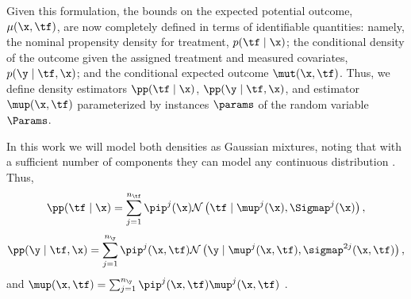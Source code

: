 Given this formulation, the bounds on the expected potential outcome, $\mu(\x, \tf)$, are now completely defined in terms of identifiable quantities: namely, the nominal propensity density for treatment, $p(\tf \mid \x)$; the conditional density of the outcome given the assigned treatment and measured covariates, $p(\y \mid \tf, \x)$; and the conditional expected outcome $\mut(\x, \tf)$. 
Thus, we define density estimators $\pp(\tf \mid \x)$, $\pp(\y \mid \tf, \x)$, and estimator $\mup(\x, \tf)$ parameterized by instances $\params$ of the random variable $\Params$.

In this work we will model both densities as Gaussian mixtures, noting that with a sufficient number of components they can model any continuous distribution \cite{titterington1985statistical}. Thus,
\begin{equation*}
    \pp(\tf \mid \x) = \sum_{j=1}^{n_{\tf}} \pip^{j}(\x) \mathcal{N}\left(\tf \mid \mup^{j}(\x), \Sigmap^{j}(\x)\right),
\end{equation*}
\begin{equation*}
    \pp(\y \mid \tf, \x) = \sum_{j=1}^{n_{\y}} \pip^{j}(\x, \tf) \mathcal{N}\left(\y \mid \mup^{j}(\x, \tf), \sigmap^{2j}(\x, \tf)\right),
\end{equation*}
and $\mup(\x, \tf) = \sum_{j=1}^{n_{\y}} \pip^{j}(\x, \tf)\mup^{j}(\x, \tf)$ \cite{bishop1994mixture}.

